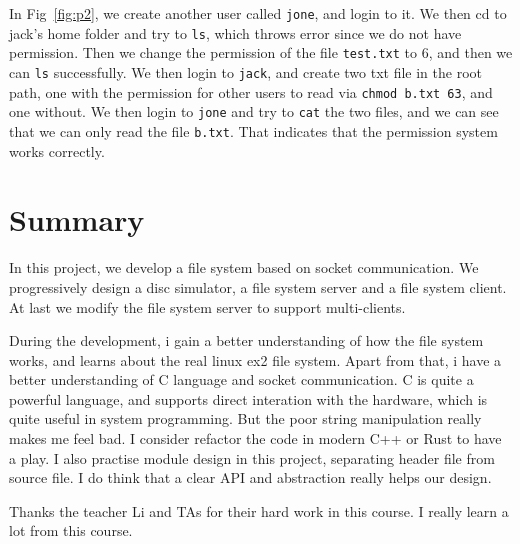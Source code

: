In Fig~\ref{fig:p2}, we create another user called \texttt{jone}, and login to it. We then cd to jack's home folder and try to \texttt{ls}, which throws error since we do not have permission. 
Then we change the permission of the file \texttt{test.txt} to 6, and then we can \texttt{ls} successfully.
We then login to \texttt{jack}, and create two txt file in the root path, one with the permission for other users to read via \texttt{chmod b.txt 63}, and one without.
We then login to \texttt{jone} and try to \texttt{cat} the two files, and we can see that we can only read the file \texttt{b.txt}. That indicates that the permission system works correctly.

\section{Summary}
In this project, we develop a file system based on socket communication. We progressively design a disc simulator, a file system server and a file system client. At last we modify the file system
server to support multi-clients.

During the development, i gain a better understanding of how the file system works, and learns about the real linux ex2 file system.
Apart from that, i have a better understanding of C language and socket communication. C is quite a powerful language, and supports direct interation with the hardware, which is quite useful in system programming.
But the poor string manipulation really makes me feel bad. I consider refactor the code in modern C++ or Rust to have a play. 
I also practise module design in this project, separating header file from source file. I do think that a clear API and abstraction really helps our design.

Thanks the teacher Li and TAs for their hard work in this course. I really learn a lot from this course.